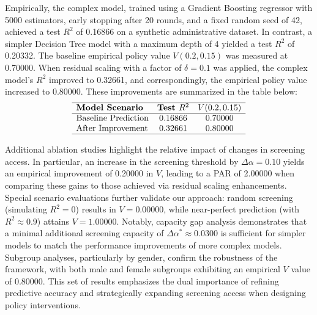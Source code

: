 \documentclass{article}
\begin{document}
Empirically, the complex model, trained using a Gradient Boosting regressor with 5000 estimators, early stopping after 20 rounds, and a fixed random seed of 42, achieved a test \(R^2\) of 0.16866 on a synthetic administrative dataset. In contrast, a simpler Decision Tree model with a maximum depth of 4 yielded a test \(R^2\) of 0.20332. The baseline empirical policy value \(V(0.2,0.15)\) was measured at 0.70000. When residual scaling with a factor of \(\delta=0.1\) was applied, the complex model's \(R^2\) improved to 0.32661, and correspondingly, the empirical policy value increased to 0.80000. These improvements are summarized in the table below:
\[
\begin{array}{lcc}
\hline
\textbf{Model Scenario} & \textbf{Test } R^2 & V(0.2,0.15) \\
\hline
\text{Baseline Prediction} & 0.16866 & 0.70000 \\
\text{After Improvement} & 0.32661 & 0.80000 \\
\hline
\end{array}
\]

Additional ablation studies highlight the relative impact of changes in screening access. In particular, an increase in the screening threshold by \(\Delta\alpha=0.10\) yields an empirical improvement of 0.20000 in \(V\), leading to a PAR of 2.00000 when comparing these gains to those achieved via residual scaling enhancements. Special scenario evaluations further validate our approach: random screening (simulating \(R^2=0\)) results in \(V=0.00000\), while near-perfect prediction (with \(R^2\approx0.9\)) attains \(V=1.00000\). Notably, capacity gap analysis demonstrates that a minimal additional screening capacity of \(\Delta\alpha^*\approx0.0300\) is sufficient for simpler models to match the performance improvements of more complex models. Subgroup analyses, particularly by gender, confirm the robustness of the framework, with both male and female subgroups exhibiting an empirical \(V\) value of 0.80000. This set of results emphasizes the dual importance of refining predictive accuracy and strategically expanding screening access when designing policy interventions.
\end{document}
